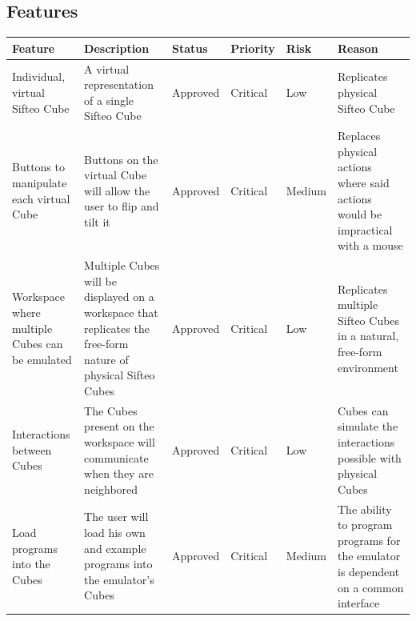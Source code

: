 \documentclass[12pt]{article}
\begin{document}
\appendix
    \begin{landscape}
    \section{Features}
    \begin{table}[h!]
      \begin{tabular}{p{1.5in} | p{2.25in} | p{.75in} | p{.75in} | p{.75in} | p{2.25in}}
        \textbf{Feature} &
        \textbf{Description} &
        \textbf{Status} &
        \textbf{Priority} &
        \textbf{Risk} &
        \textbf{Reason} \\ \hline

        Individual, virtual Sifteo Cube &
        A virtual representation of a single Sifteo Cube &
        Approved &
        Critical &
        Low &
        Replicates physical Sifteo Cube \\ \hline

        Buttons to manipulate each virtual Cube &
        Buttons on the virtual Cube will allow the user to flip and tilt it &
        Approved &
        Critical &
        Medium &
        Replaces physical actions where said actions would be impractical with a mouse \\ \hline

        Workspace where multiple Cubes can be emulated &
        Multiple Cubes will be displayed on a workspace that replicates the free-form nature of physical Sifteo Cubes\index{Sifteo Cubes} &
        Approved &
        Critical &
        Low &
        Replicates multiple Sifteo Cubes\index{Sifteo Cubes} in a natural, free-form environment \\ \hline

        Interactions between Cubes &
        The Cubes present on the workspace will communicate when they are neighbored &
        Approved &
        Critical &
        Low &
        Cubes can simulate the interactions possible with physical Cubes \\ \hline

        Load programs into the Cubes &
        The user will load his own and example programs into the emulator’s\index{emulator} Cubes &
        Approved &
        Critical &
        Medium &
        The ability to program programs for the emulator\index{emulator} is dependent on a common interface \\ \hline


\end{tabular}
\end{table}
\end{landscape}
\end{document}
